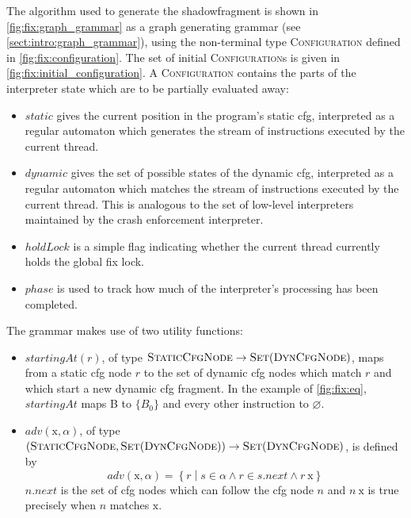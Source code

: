 \noindent
The algorithm used to generate the \gls{shadowfragment} is shown in
\autoref{fig:fix:graph_grammar} as a graph generating grammar (see
\autoref{sect:intro:graph_grammar}), using the non-terminal type
\textsc{Configuration} defined in \autoref{fig:fix:configuration}.
The set of initial \textsc{Configuration}s is given in
\autoref{fig:fix:initial_configuration}.  A \textsc{Configuration}
contains the parts of the interpreter state which are to be partially
evaluated away:
\begin{itemize}
\item $\mathit{static}$ gives the current position in the program's
  static \gls{cfg}, interpreted as a regular automaton which generates
  the stream of instructions executed by the current thread.
\item $\mathit{dynamic}$ gives the set of possible states of the dynamic
  \gls{cfg}, interpreted as a regular automaton which matches the
  stream of instructions executed by the current thread.  This is
  analogous to the set of low-level interpreters maintained by the
  crash enforcement interpreter.
\item $\mathit{holdLock}$ is a simple flag indicating whether the
  current thread currently holds the global fix lock.
\item $\mathit{phase}$ is used to track how much of the interpreter's
  processing has been completed.
\end{itemize}
The grammar makes use of two utility functions:
\begin{itemize}
\item $\mathit{startingAt}(r)$, of type $\textsc{StaticCfgNode}
  \rightarrow \textsc{Set}(\textsc{DynCfgNode})$, maps from a static
  \gls{cfg} node $r$ to the set of dynamic \gls{cfg} nodes which match
  $r$ and which start a new dynamic \gls{cfg} fragment.  In the
  example of \autoref{fig:fix:eq}, $\mathit{startingAt}$ maps B to
  $\{B_0\}$ and every other instruction to $\varnothing$.
\item $\mathit{adv}(\mathrm{x}, \alpha)$, of type
  $(\textsc{StaticCfgNode}, \textsc{Set}(\textsc{DynCfgNode}))
  \rightarrow \textsc{Set}(\textsc{DynCfgNode})$, is defined by
  \begin{displaymath}
    \mathit{adv}(\mathrm{x}, \alpha) = \left\{r \middle| s \in \alpha \wedge r \in s.\mathit{next} \wedge r ~ \mathrm{x}\right\}
  \end{displaymath}
  $n.\mathit{next}$ is the set of \gls{cfg} nodes which can follow the
  \gls{cfg} node $n$ and $n ~ \mathrm{x}$ is true precisely when $n$
  matches $\mathrm{x}$.
\end{itemize}
